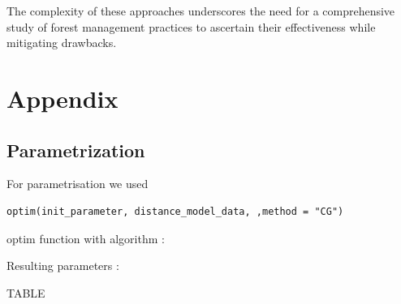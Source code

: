 \documentclass{article}
\begin{document}
The complexity of these approaches underscores the need for a comprehensive study of forest management practices to ascertain their effectiveness while mitigating drawbacks.

\printbibliography

\section{Appendix}

\subsection{Parametrization}

For parametrisation we used 
\begin{lstlisting}
optim(init_parameter, distance_model_data, ,method = "CG")
\end{lstlisting}

optim function with algorithm : 

Resulting parameters :

TABLE
\end{document}
